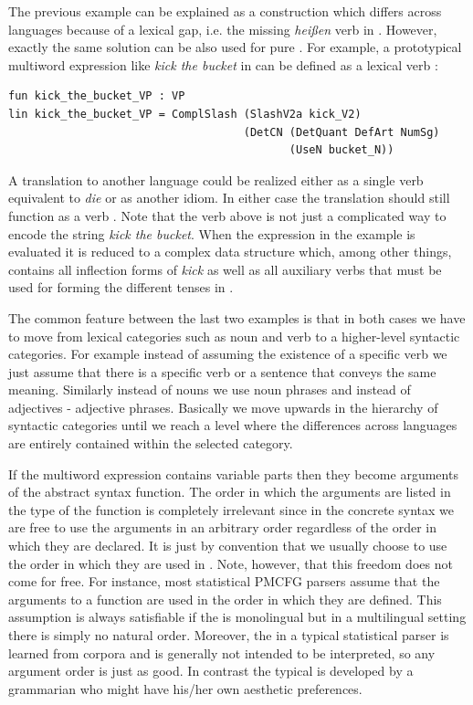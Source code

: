 \documentclass[output=paper]{langsci/langscibook}
\begin{document}
The previous example can be explained as a construction which differs
across languages because of a lexical gap, i.e. the missing \textit{hei{\ss}en}
verb in . However, exactly the same solution can be also used for
pure . For example, a prototypical multiword expression like
\textit{kick the bucket} in  can be defined as a lexical verb :
\begin{verbatim}
fun kick_the_bucket_VP : VP
lin kick_the_bucket_VP = ComplSlash (SlashV2a kick_V2) 
                                    (DetCN (DetQuant DefArt NumSg)
                                           (UseN bucket_N))
\end{verbatim}
A translation to another language could be realized either as a single
verb equivalent to \textit{die} or as another idiom. In either case
the translation should still function as a verb . Note that the
verb  above is not just a complicated way to encode the string 
\textit{kick the bucket}. When the expression in the example is evaluated
it is reduced to a complex data structure which, among other things, contains
all inflection forms of \textit{kick} as well as all auxiliary verbs that
must be used for forming the different tenses in .

The common feature between the last two examples is that in both
cases we have to move from lexical categories such as noun and verb
to a higher-level syntactic categories. For example instead of assuming
the existence of a specific verb we just assume that there is a specific
verb  or a sentence that conveys the same meaning. Similarly
instead of nouns we use noun phrases and instead of adjectives - adjective phrases.
Basically we move upwards in the hierarchy of syntactic categories until
we reach a level where the differences across languages are entirely
contained within the selected category. 

If the multiword expression
contains variable parts then they become arguments of the abstract
syntax function. The order in which the arguments are listed in the
type of the function is completely irrelevant since in the concrete
syntax we are free to use the arguments in an arbitrary order regardless 
of the order in which they are declared. It is just by convention that
we usually choose to use the order in which they are used in .
Note, however, that this freedom does not come for free. 
For instance, most statistical PMCFG parsers assume that 
the arguments to a function are used in the order in which they are defined.
This assumption is always satisfiable if the  is monolingual but in 
a multilingual setting there is simply no natural order. Moreover,
the  in a typical statistical parser is learned from corpora
and is generally not intended to be interpreted, so any argument order
is just as good. In contrast the typical  
is developed by a grammarian who might have his/her own aesthetic
preferences.
\end{document}
